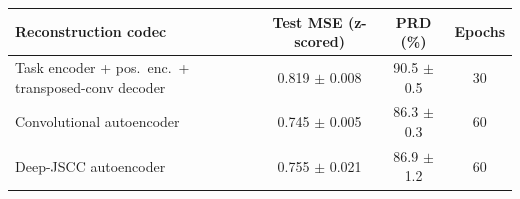 \begin{tabular}{lccc}
\toprule
Reconstruction codec & Test MSE (z-scored) & PRD (\%) & Epochs \\
\midrule
Task encoder + pos.\ enc.\ + transposed-conv decoder & 0.819 $\pm$ 0.008 & 90.5 $\pm$ 0.5 & 30 \\
Convolutional autoencoder & 0.745 $\pm$ 0.005 & 86.3 $\pm$ 0.3 & 60 \\
Deep-JSCC autoencoder & 0.755 $\pm$ 0.021 & 86.9 $\pm$ 1.2 & 60 \\
\bottomrule
\end{tabular}
